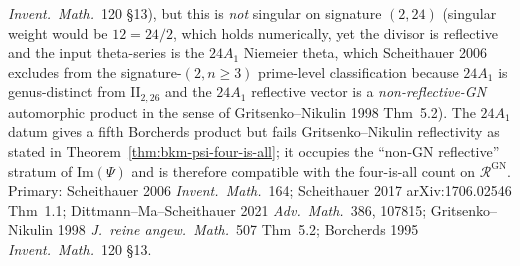 \begin{remark}
\emph{Invent.\ Math.}~120 \S13), but this is \emph{not} singular
on signature $(2,24)$ (singular weight would be $12 = 24/2$,
which holds numerically, yet the divisor is reflective and the
input theta-series is the $24A_1$ Niemeier theta, which
Scheithauer 2006 excludes from the signature-$(2,n\ge 3)$
prime-level classification because $24A_1$ is genus-distinct
from $\mathrm{II}_{2,26}$ and the $24A_1$ reflective vector is
a \emph{non-reflective-GN} automorphic product in the sense of
Gritsenko--Nikulin 1998 Thm~5.2). The $24A_1$ datum gives a
fifth Borcherds product but fails Gritsenko--Nikulin
reflectivity as stated in Theorem~\ref{thm:bkm-psi-four-is-all};
it occupies the ``non-GN reflective'' stratum of $\mathrm{Im}(\Psi)$
and is therefore compatible with the four-is-all count on
$\mathcal R^{\mathrm{GN}}$. Primary: Scheithauer 2006
\emph{Invent.\ Math.}~164; Scheithauer 2017
arXiv:1706.02546 Thm~1.1; Dittmann--Ma--Scheithauer 2021
\emph{Adv.\ Math.}~386, 107815; Gritsenko--Nikulin 1998
\emph{J.\ reine angew.\ Math.}~507 Thm~5.2; Borcherds 1995
\emph{Invent.\ Math.}~120 \S13.
\end{remark}

